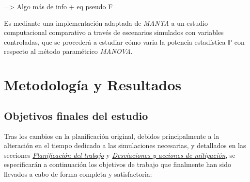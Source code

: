 \documentclass[IB,BIB]{TFUOC}%
\newcommand{\myequations}[1]{
\refstepcounter{myequations}%
\par\noindent\textbf{Equation \themyequations. 1}
\addcontentsline{equ}{myequations}{\protect\numberline{\thechapter.\themyequations}1}\par}
\begin{document}
=> Algo más de info + eq pseudo F

% 

Es mediante una implementación adaptada de \textit{MANTA} a un estudio computacional comparativo a través de escenarios simulados con variables controladas, que se procederá a estudiar cómo varia la potencia estadística \( \mathbb P \) con respecto al método paramétrico \textit{MANOVA}.




\chapter{Metodología y Resultados}
\label{chap:Metodología y Resultados}



% 

\section{Objetivos finales del estudio}
\label{sec:Objetivos finales del estudio}

Tras los cambios en la planificación original, debidos principalmente a la alteración en el tiempo dedicado a las simulaciones necesarias, y detallados en las secciones \textit{\hyperref[sec:Planificación del trabajo]{Planificación del trabajo}} y \textit{\hyperref[sec:Desviaciones y acciones de mitigación]{Desviaciones y acciones de mitigación}}, se especificarán a continuación los objetivos de trabajo que finalmente han sido llevados a cabo de forma completa y satisfactoria:
\end{document}
